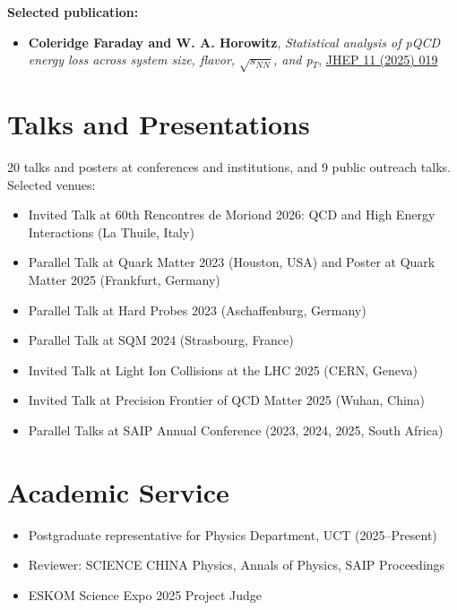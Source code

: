 \documentclass[10pt,letter,sans]{moderncv}
\begin{document}
\smallskip
\textbf{Selected publication:}
\begin{itemize}
  \setlength{\itemsep}{0pt}
  \setlength{\parskip}{0pt}
  \item \textbf{Coleridge Faraday and W. A. Horowitz}, \textit{Statistical analysis of pQCD energy loss across system size, flavor, \( \sqrt{s_{NN}} \), and p\(_{T}\)}, \href{https://doi.org/10.1007/JHEP11(2025)019}{JHEP 11 (2025) 019}
\end{itemize}


\section{Talks and Presentations}
20 talks and posters at conferences and institutions, and 9 public outreach talks.
Selected venues:
\begin{itemize}
  \setlength{\itemsep}{0pt}
  \setlength{\parskip}{0pt}
  \item Invited Talk at 60th Rencontres de Moriond 2026: QCD and High Energy Interactions (La Thuile, Italy)
  \item Parallel Talk at Quark Matter 2023 (Houston, USA) and Poster at Quark Matter 2025 (Frankfurt, Germany)
  \item Parallel Talk at Hard Probes 2023 (Aschaffenburg, Germany)
  \item Parallel Talk at SQM 2024 (Strasbourg, France)
  \item Invited Talk at Light Ion Collisions at the LHC 2025 (CERN, Geneva)
  \item Invited Talk at Precision Frontier of QCD Matter 2025 (Wuhan, China)
  \item Parallel Talks at SAIP Annual Conference (2023, 2024, 2025, South Africa)
\end{itemize}


\section{Academic Service}
\begin{itemize}
  \setlength{\itemsep}{0pt}
  \setlength{\parskip}{0pt}
  \item Postgraduate representative for Physics Department, UCT (2025--Present)
  \item Reviewer: SCIENCE CHINA Physics, Annals of Physics, SAIP Proceedings
  \item ESKOM Science Expo 2025 Project Judge
\end{itemize}
\end{document}
